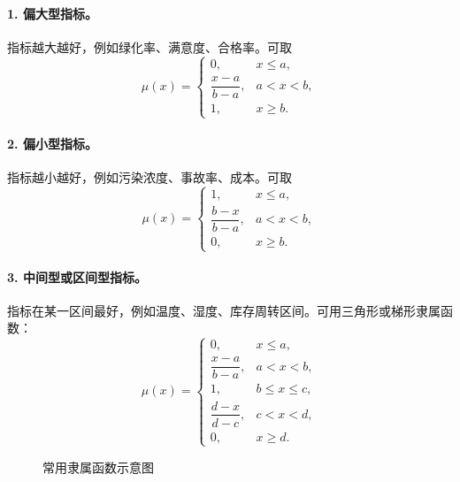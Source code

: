 \documentclass[UTF8,zihao=-4,fontset=none]{ctexart}
\begin{document}
\paragraph{1. 偏大型指标。} 指标越大越好，例如绿化率、满意度、合格率。可取
\begin{equation}
\mu(x)=
\begin{cases}
0, & x\le a,\\
\dfrac{x-a}{b-a}, & a<x<b,\\
1, & x\ge b.
\end{cases}
\end{equation}

\paragraph{2. 偏小型指标。} 指标越小越好，例如污染浓度、事故率、成本。可取
\begin{equation}
\mu(x)=
\begin{cases}
1, & x\le a,\\
\dfrac{b-x}{b-a}, & a<x<b,\\
0, & x\ge b.
\end{cases}
\end{equation}

\paragraph{3. 中间型或区间型指标。} 指标在某一区间最好，例如温度、湿度、库存周转区间。可用三角形或梯形隶属函数：
\begin{equation}
\mu(x)=
\begin{cases}
0, & x\le a,\\
\dfrac{x-a}{b-a}, & a<x<b,\\
1, & b\le x\le c,\\
\dfrac{d-x}{d-c}, & c<x<d,\\
0, & x\ge d.
\end{cases}
\end{equation}

\begin{figure}[H]
\centering
{}
\caption{常用隶属函数示意图}
\label{fig:membership}
\end{figure}
\end{document}
